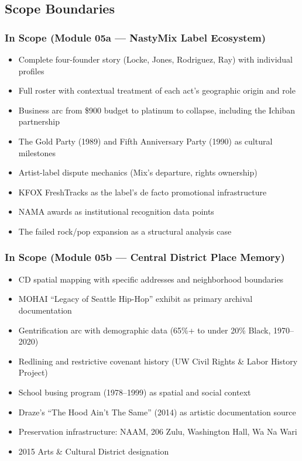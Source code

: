 \documentclass[11pt,letterpaper]{article}
\begin{document}
\subsection{Scope Boundaries}

\subsubsection{In Scope (Module 05a --- NastyMix Label Ecosystem)}

\begin{itemize}
\item Complete four-founder story (Locke, Jones, Rodriguez, Ray) with individual profiles
\item Full roster with contextual treatment of each act's geographic origin and role
\item Business arc from \$900 budget to platinum to collapse, including the Ichiban partnership
\item The Gold Party (1989) and Fifth Anniversary Party (1990) as cultural milestones
\item Artist-label dispute mechanics (Mix's departure, rights ownership)
\item KFOX FreshTracks as the label's de facto promotional infrastructure
\item NAMA awards as institutional recognition data points
\item The failed rock/pop expansion as a structural analysis case
\end{itemize}

\subsubsection{In Scope (Module 05b --- Central District Place Memory)}

\begin{itemize}
\item CD spatial mapping with specific addresses and neighborhood boundaries
\item MOHAI ``Legacy of Seattle Hip-Hop'' exhibit as primary archival documentation
\item Gentrification arc with demographic data (65\%+ to under 20\% Black, 1970--2020)
\item Redlining and restrictive covenant history (UW Civil Rights \& Labor History Project)
\item School busing program (1978--1999) as spatial and social context
\item Draze's ``The Hood Ain't The Same'' (2014) as artistic documentation source
\item Preservation infrastructure: NAAM, 206 Zulu, Washington Hall, Wa Na Wari
\item 2015 Arts \& Cultural District designation
\end{itemize}
\end{document}
